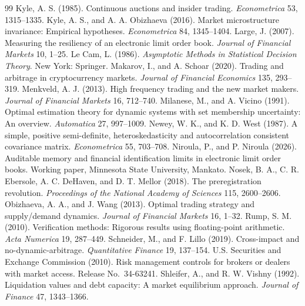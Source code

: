 \begin{thebibliography}{99}
 Kyle, A. S. (1985). Continuous auctions and insider trading. \emph{Econometrica} 53, 1315--1335.
 Kyle, A. S., and A. A. Obizhaeva (2016). Market microstructure invariance: Empirical hypotheses. \emph{Econometrica} 84, 1345--1404.
 Large, J. (2007). Measuring the resiliency of an electronic limit order book. \emph{Journal of Financial Markets} 10, 1--25.
 Le Cam, L. (1986). \emph{Asymptotic Methods in Statistical Decision Theory}. New York: Springer.
 Makarov, I., and A. Schoar (2020). Trading and arbitrage in cryptocurrency markets. \emph{Journal of Financial Economics} 135, 293--319.
 Menkveld, A. J. (2013). High frequency trading and the new market makers. \emph{Journal of Financial Markets} 16, 712--740.
 Milanese, M., and A. Vicino (1991). Optimal estimation theory for dynamic systems with set membership uncertainty: An overview. \emph{Automatica} 27, 997--1009.
 Newey, W. K., and K. D. West (1987). A simple, positive semi-definite, heteroskedasticity and autocorrelation consistent covariance matrix. \emph{Econometrica} 55, 703--708.
 Niroula, P., and P. Niroula (2026). Auditable memory and financial identification limits in electronic limit order books. Working paper, Minnesota State University, Mankato.
 Nosek, B. A., C. R. Ebersole, A. C. DeHaven, and D. T. Mellor (2018). The preregistration revolution. \emph{Proceedings of the National Academy of Sciences} 115, 2600--2606.
 Obizhaeva, A. A., and J. Wang (2013). Optimal trading strategy and supply/demand dynamics. \emph{Journal of Financial Markets} 16, 1--32.
 Rump, S. M. (2010). Verification methods: Rigorous results using floating-point arithmetic. \emph{Acta Numerica} 19, 287--449.
 Schneider, M., and F. Lillo (2019). Cross-impact and no-dynamic-arbitrage. \emph{Quantitative Finance} 19, 137--154.
 U.S. Securities and Exchange Commission (2010). Risk management controls for brokers or dealers with market access. Release No.\ 34-63241.
 Shleifer, A., and R. W. Vishny (1992). Liquidation values and debt capacity: A market equilibrium approach. \emph{Journal of Finance} 47, 1343--1366.

\end{thebibliography}
